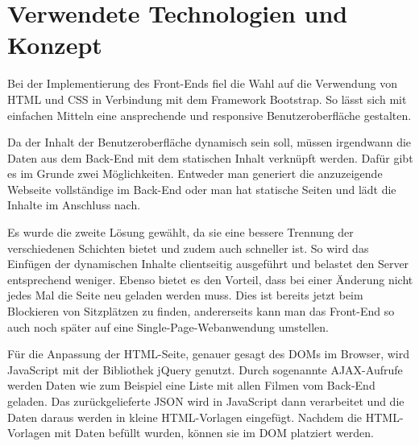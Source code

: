 \section{Verwendete Technologien und Konzept}

Bei der Implementierung des Front-Ends fiel die Wahl auf die Verwendung von \acs{HTML} und \acs{CSS} in Verbindung mit dem Framework Bootstrap.
So lässt sich mit einfachen Mitteln eine ansprechende und responsive Benutzeroberfläche gestalten.

Da der Inhalt der Benutzeroberfläche dynamisch sein soll, müssen irgendwann die Daten aus dem Back-End mit dem statischen Inhalt verknüpft werden.
Dafür gibt es im Grunde zwei Möglichkeiten.
Entweder man generiert die anzuzeigende Webseite vollständige im Back-End oder man hat statische Seiten und lädt die Inhalte im Anschluss nach.

Es wurde die zweite Lösung gewählt, da sie eine bessere Trennung der verschiedenen Schichten bietet und zudem auch schneller ist.
So wird das Einfügen der dynamischen Inhalte clientseitig ausgeführt und belastet den Server entsprechend weniger.
Ebenso bietet es den Vorteil, dass bei einer Änderung nicht jedes Mal die Seite neu geladen werden muss.
Dies ist bereits jetzt beim Blockieren von Sitzplätzen zu finden, andererseits kann man das Front-End so auch noch später auf eine Single-Page-Webanwendung umstellen.

Für die Anpassung der \acs{HTML}-Seite, genauer gesagt des \acs{DOM}s im Browser, wird Java\-Script mit der Bibliothek jQuery genutzt.
Durch sogenannte \acs{AJAX}-Aufrufe werden Daten wie zum Beispiel eine Liste mit allen Filmen vom Back-End geladen.
Das zurückgelieferte \acs{JSON} wird in JavaScript dann verarbeitet und die Daten daraus werden in kleine \acs{HTML}-Vorlagen eingefügt.
Nachdem die \acs{HTML}-Vorlagen mit Daten befüllt wurden, können sie im \acs{DOM} platziert werden.
